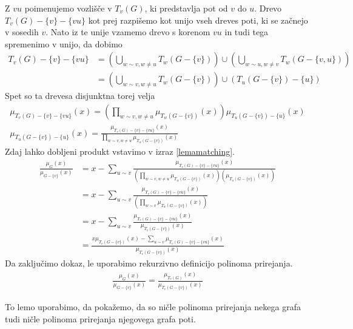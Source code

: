 \begin{dokaz}
    Z \(vu\) poimenujemo vozlišče v \(T_v(G)\), ki predstavlja pot od \(v\) do \(u\). Drevo \(T_v(G) - \{v\} - \{vu\}\) kot prej razpišemo kot unijo vseh dreves poti, ki se začnejo v sosedih \(v\). Nato iz te unije vzamemo drevo s korenom \(vu\) in tudi tega spremenimo v unijo, da dobimo
    \begin{align*}
        T_v(G) - \{v\} - \{vu\} & = \left(\bigcup_{w\sim v, w\neq u} T_w(G-\{v\})\right) \cup \left(\bigcup_{w\sim u, w\neq v} T_w(G-\{v,u\})\right) \\
                                & = \left(\bigcup_{w\sim v, w\neq u} T_w(G-\{v\})\right) \cup (T_u(G-\{v\}) - \{u\})
    \end{align*}
    Spet so ta drevesa disjunktna torej velja
    \begin{align*}
        \mu_{T_v(G) - \{v\} - \{vu\}}(x) = \left(\prod_{w\sim v, w\neq u} \mu_{T_w(G-\{v\})}(x)\right) \mu_{T_u(G-\{v\}) - \{u\}}(x) \\
        \mu_{T_u(G-\{v\}) - \{u\}}(x) = \frac{\mu_{T_v(G) - \{v\} - \{vu\}}(x)}{\prod_{w\sim v, w\neq u} \mu_{T_w(G-\{v\})}(x)}
    \end{align*}
    Zdaj lahko dobljeni produkt vstavimo v izraz \ref{lemamatching}.
    \begin{align*}
        \frac{\mu_G(x)}{\mu_{G-\{v\}}(x)} & =x - \sum_{u\sim v}\frac{\mu_{T_v(G) - \{v\} - \{vu\}}(x)}{(\prod_{w\sim v, w\neq u} \mu_{T_w(G-\{v\})}(x))(\mu_{T_u(G-\{v\})}(x))} \\
                                          & = x - \sum_{u\sim v}\frac{\mu_{T_v(G) - \{v\} - \{vu\}}(x)}{(\prod_{w\sim v} \mu_{T_w(G-\{v\})}(x))}                                \\
                                          & = x - \sum_{u\sim v}\frac{\mu_{T_v(G) - \{v\} - \{vu\}}(x)}{\mu_{T_v(G-\{v\})}(x)}                                                  \\
                                          & = \frac{x \mu_{T_v(G-\{v\})}(x) - \sum_{u\sim v} \mu_{T_v(G) - \{v\} - \{vu\}}(x)}{\mu_{T_v(G-\{v\})}(x)}
    \end{align*}
    Da zaključimo dokaz, le uporabimo rekurzivno definicijo polinoma prirejanja.
    \begin{align*}
        \frac{\mu_G(x)}{\mu_{G-\{v\}}(x)} = \frac{\mu_{T_v(G)}(x)}{\mu_{T_v(G-\{v\})}(x)}
    \end{align*}
\end{dokaz}

To lemo uporabimo, da pokažemo, da so ničle polinoma prirejanja nekega grafa tudi ničle polinoma prirejanja njegovega grafa poti.


